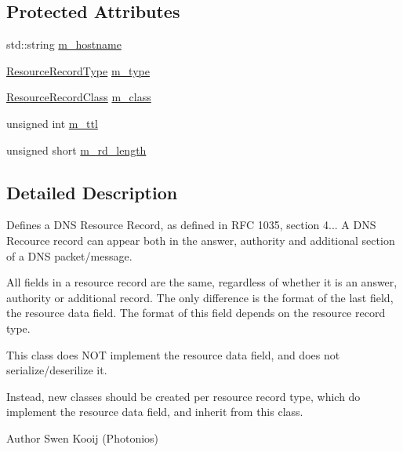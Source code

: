 \subsection*{Protected Attributes}
\begin{DoxyCompactItemize}
\item 
std\-::string \hyperlink{class_senergy_1_1_dns_1_1_resource_record_a3992d42302c4bc939f39c58546aaacaf}{m\-\_\-hostname}
\item 
\hyperlink{namespace_senergy_1_1_dns_a590bfd748c955364770f5ce358d9dfe0}{Resource\-Record\-Type} \hyperlink{class_senergy_1_1_dns_1_1_resource_record_a443ff133b10a314058bc6174558415a8}{m\-\_\-type}
\item 
\hyperlink{namespace_senergy_1_1_dns_a953f153bc411213d621d00c1e1b3eb9d}{Resource\-Record\-Class} \hyperlink{class_senergy_1_1_dns_1_1_resource_record_a8eea45baed16ff1c408682d9da59b7c6}{m\-\_\-class}
\item 
unsigned int \hyperlink{class_senergy_1_1_dns_1_1_resource_record_ac30e456e4945e8bb9abd3d55fa168ff5}{m\-\_\-ttl}
\item 
unsigned short \hyperlink{class_senergy_1_1_dns_1_1_resource_record_a598323d2f75156a289df1152e30b563b}{m\-\_\-rd\-\_\-length}
\end{DoxyCompactItemize}


\subsection{Detailed Description}
Defines a D\-N\-S Resource Record, as defined in R\-F\-C 1035, section 4... A D\-N\-S Recource record can appear both in the answer, authority and additional section of a D\-N\-S packet/message. 

All fields in a resource record are the same, regardless of whether it is an answer, authority or additional record. The only difference is the format of the last field, the resource data field. The format of this field depends on the resource record type. \begin{DoxyVerb}This class does NOT implement the resource data field, and does not serialize/deserilize it.
\end{DoxyVerb}
 Instead, new classes should be created per resource record type, which do implement the resource data field, and inherit from this class.

\begin{DoxyAuthor}{Author}
Swen Kooij (Photonios) 
\end{DoxyAuthor}


